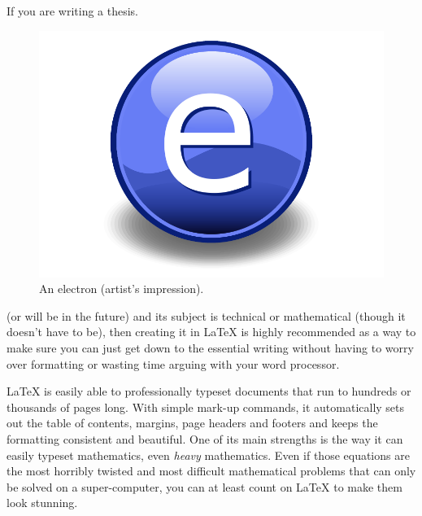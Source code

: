 If you are writing a thesis.

\begin{figure}
    \centering
    \includegraphics{Figures/Electron}
    \caption[An Electron]{An electron (artist's impression).}
    \label{fig:Electron}
\end{figure}
(or will be in the future) and its subject is technical or mathematical (though it doesn't have to be), then creating it in \LaTeX{} is highly recommended as a way to make sure you can just get down to the essential writing without having to worry over formatting or wasting time arguing with your word processor.

\LaTeX{} is easily able to professionally typeset documents that run to hundreds or thousands of pages long. With simple mark-up commands, it automatically sets out the table of contents, margins, page headers and footers and keeps the formatting consistent and beautiful. One of its main strengths is the way it can easily typeset mathematics, even \emph{heavy} mathematics. Even if those equations are the most horribly twisted and most difficult mathematical problems that can only be solved on a super-computer, you can at least count on \LaTeX{} to make them look stunning.

